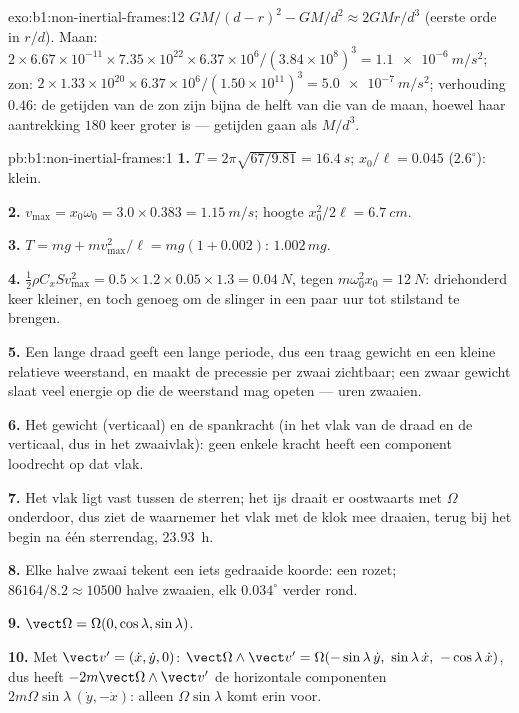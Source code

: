\begin{solution}{exo:b1:non-inertial-frames:12}
$GM/(d - r)^2 - GM/d^2 \approx 2GMr/d^3$ (eerste orde in $r/d$). Maan:
$2 \times 6.67\times10^{-11} \times 7.35\times10^{22} \times 6.37\times10^6/
(3.84\times10^8)^3 = \qty{1.1e-6}{m/s^2}$; zon: $2 \times 1.33\times10^{20}
\times 6.37\times10^6/(1.50\times10^{11})^3 = \qty{5.0e-7}{m/s^2}$; verhouding
$0.46$: de getijden van de zon zijn bijna de helft van die van de maan, hoewel haar
aantrekking $180$ keer groter is --- getijden gaan als $M/d^3$.
\end{solution}

\begin{solution}{pb:b1:non-inertial-frames:1}
\textbf{1.} $T = 2\pi\sqrt{67/9.81} = \qty{16.4}{s}$; $x_0/\ell = 0.045$
($2.6^\circ$): klein.

\textbf{2.} $v_{\max} = x_0\omega_0 = 3.0 \times 0.383 = \qty{1.15}{m/s}$; hoogte
$x_0^2/2\ell = \qty{6.7}{cm}$.

\textbf{3.} $T = mg + mv_{\max}^2/\ell = mg(1 + 0.002)$: $1.002\,mg$.

\textbf{4.} $\tfrac12\rho C_xSv_{\max}^2 = 0.5 \times 1.2 \times 0.05 \times 1.3 =
\qty{0.04}{N}$, tegen $m\omega_0^2x_0 = \qty{12}{N}$: driehonderd keer
kleiner, en toch genoeg om de slinger in een paar uur tot stilstand te brengen.

\textbf{5.} Een lange draad geeft een lange periode, dus een traag gewicht en een
kleine relatieve weerstand, en maakt de precessie per zwaai zichtbaar; een
zwaar gewicht slaat veel energie op die de weerstand mag opeten --- uren zwaaien.

\textbf{6.} Het gewicht (verticaal) en de spankracht (in het vlak van de draad en
de verticaal, dus in het zwaaivlak): geen enkele kracht heeft een component
loodrecht op dat vlak.

\textbf{7.} Het vlak ligt vast tussen de sterren; het ijs draait er
oostwaarts met $\Omega$ onderdoor, dus ziet de waarnemer het vlak met de klok mee draaien,
terug bij het begin na één sterrendag, \qty{23.93}{h}.

\textbf{8.} Elke halve zwaai tekent een iets gedraaide koorde: een rozet;
$86164/8.2 \approx 10500$ halve zwaaien, elk $0.034^\circ$ verder rond.

\textbf{9.} $\vect\Omega = \Omega(0, \cos\lambda, \sin\lambda)$.

\textbf{10.} Met $\vect v' = (\dot x, \dot y, 0)$:
$\vect\Omega\wedge\vect v' = \Omega(-\sin\lambda\,\dot y,\ \sin\lambda\,\dot x,\ -\cos\lambda\,\dot x)$,
dus heeft $-2m\vect\Omega\wedge\vect v'$ de horizontale componenten
$2m\Omega\sin\lambda\,(\dot y, -\dot x)$: alleen $\Omega\sin\lambda$ komt erin voor.


\end{solution}
